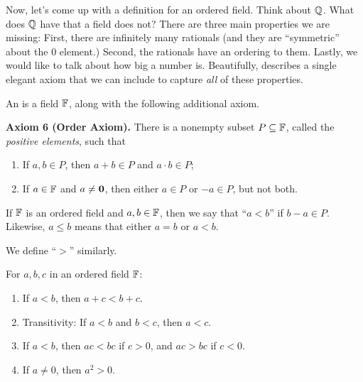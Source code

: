 \begin{remark}
  Now, let's come up with a definition for an ordered field. Think
  about $\mathbb Q$. What does $\mathbb Q$ have that a field does not? There are
  three main properties we are missing: First, there are infinitely
  many rationals (and they are ``symmetric'' about the 0 element.)
  Second, the rationals have an ordering to them. Lastly, we would
  like to talk about how big a number is. Beautifully,
   describes a single elegant axiom that we
  can include to capture \textit{all} of these properties.
\end{remark}

\begin{definition}
  An  is a field $\mathbb F$, along with the following
  additional axiom.

  \textbf{Axiom 6 (Order Axiom).} There is a nonempty subset $P
  \subseteq \mathbb F$, called the \textit{positive elements}, such that
  \begin{enumerate}
    \item If $a, b \in P$, then $a + b \in P$ and $a \cdot b \in P$;
    \item If $a \in \mathbb F$ and $a \neq \textbf{0}$, then either $a \in P$ or
      $-a \in P$, but not both.
  \end{enumerate}
\end{definition}

\begin{definition}[Inequalities]
  If $\mathbb F$ is an ordered field and $a, b \in \mathbb F$, then we say that
  ``$a < b$'' if $b - a \in P$. Likewise, $a \leq b$ means that
  either $a = b$ or $a < b$.

  We define ``$>$'' similarly.
\end{definition}

\begin{fact}
  For $a, b, c$ in an ordered field $\mathbb F$:
  \begin{enumerate}
    \item If $a < b$, then $a + c < b + c$.
    \item Transitivity: If $a < b$ and $b < c$, then $a < c$.
    \item If $a < b$, then $ac < bc$ if $c > 0$, and $ac > bc$ if $c < 0$.
    \item If $a \neq 0$, then $a^2 > 0$.
  \end{enumerate}
\end{fact}

